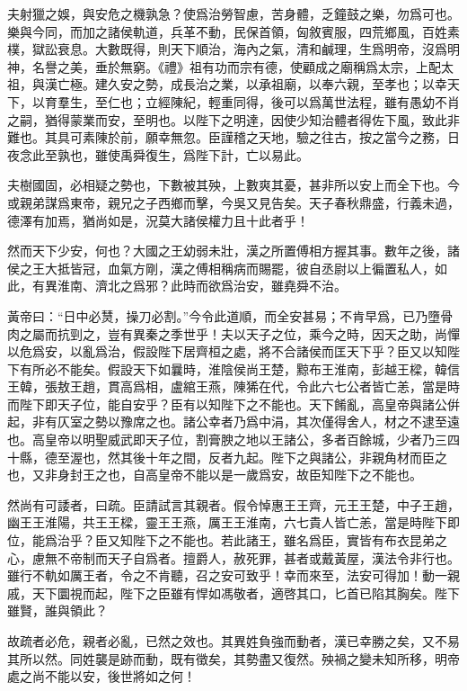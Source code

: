 \documentclass[12pt,a4paper]{ctexbook}
\begin{document}
夫射獵之娛，與安危之機孰急？使爲治勞智慮，苦身體，乏鐘鼓之樂，勿爲可也。樂與今同，而加之諸侯軌道，兵革不動，民保首領，匈敘賓服，四荒鄉風，百姓素樸，獄訟衰息。大數既得，則天下順治，海內之氣，清和鹹理，生爲明帝，沒爲明神，名譽之美，垂於無窮。《禮》祖有功而宗有德，使顧成之廟稱爲太宗，上配太祖，與漢亡極。建久安之勢，成長治之業，以承祖廟，以奉六親，至孝也；以幸天下，以育羣生，至仁也；立經陳紀，輕重同得，後可以爲萬世法程，雖有愚幼不肖之嗣，猶得蒙業而安，至明也。以陛下之明達，因使少知治體者得佐下風，致此非難也。其具可素陳於前，願幸無忽。臣謹稽之天地，驗之往古，按之當今之務，日夜念此至孰也，雖使禹舜復生，爲陛下計，亡以易此。\par
夫樹國固，必相疑之勢也，下數被其殃，上數爽其憂，甚非所以安上而全下也。今或親弟謀爲東帝，親兄之子西鄉而擊，今吳又見告矣。天子春秋鼎盛，行義未過，德澤有加焉，猶尚如是，況莫大諸侯權力且十此者乎！\par
然而天下少安，何也？大國之王幼弱未壯，漢之所置傅相方握其事。數年之後，諸侯之王大抵皆冠，血氣方剛，漢之傅相稱病而賜罷，彼自丞尉以上徧置私人，如此，有異淮南、濟北之爲邪？此時而欲爲治安，雖堯舜不治。\par
黃帝曰：“日中必熭，操刀必割。”今令此道順，而全安甚易；不肯早爲，已乃墮骨肉之屬而抗剄之，豈有異秦之季世乎！夫以天子之位，乘今之時，因天之助，尚憚以危爲安，以亂爲治，假設陛下居齊桓之處，將不合諸侯而匡天下乎？臣又以知陛下有所必不能矣。假設天下如曩時，淮陰侯尚王楚，黥布王淮南，彭越王樑，韓信王韓，張敖王趙，貫高爲相，盧綰王燕，陳狶在代，令此六七公者皆亡恙，當是時而陛下即天子位，能自安乎？臣有以知陛下之不能也。天下餚亂，高皇帝與諸公倂起，非有仄室之勢以豫席之也。諸公幸者乃爲中涓，其次僅得舍人，材之不逮至遠也。高皇帝以明聖威武即天子位，割膏腴之地以王諸公，多者百餘城，少者乃三四十縣，德至渥也，然其後十年之間，反者九起。陛下之與諸公，非親角材而臣之也，又非身封王之也，自高皇帝不能以是一歲爲安，故臣知陛下之不能也。\par
然尚有可諉者，曰疏。臣請試言其親者。假令悼惠王王齊，元王王楚，中子王趙，幽王王淮陽，共王王樑，靈王王燕，厲王王淮南，六七貴人皆亡恙，當是時陛下即位，能爲治乎？臣又知陛下之不能也。若此諸王，雖名爲臣，實皆有布衣昆弟之心，慮無不帝制而天子自爲者。擅爵人，赦死罪，甚者或戴黃屋，漢法令非行也。雖行不軌如厲王者，令之不肯聽，召之安可致乎！幸而來至，法安可得加！動一親戚，天下圜視而起，陛下之臣雖有悍如馮敬者，適啓其口，匕首已陷其胸矣。陛下雖賢，誰與領此？\par
故疏者必危，親者必亂，已然之效也。其異姓負強而動者，漢已幸勝之矣，又不易其所以然。同姓襲是跡而動，既有徵矣，其勢盡又復然。殃禍之變未知所移，明帝處之尚不能以安，後世將如之何！\par
\end{document}
